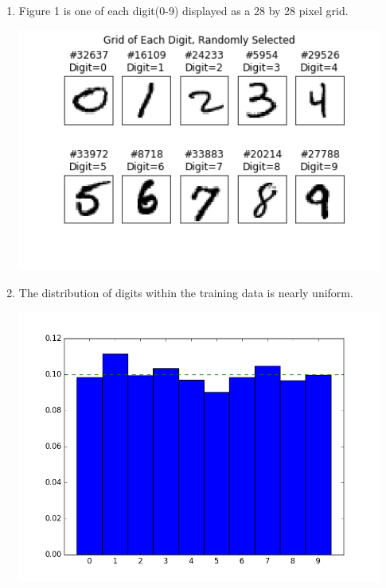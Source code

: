 \documentclass{report}
\begin{document}
\begin{enumerate}
\begin{enumerate}[label=(\alph*)]
		\item Figure 1 is one of each digit(0-9) displayed as a 28 by 28 pixel grid.  
		\begin{center}
		\includegraphics[width=12cm]{one_grid_x_each_digit.png}
		\end{center}
		\item The distribution of digits within the training data is nearly uniform.
		\begin{center}
		\includegraphics[width=12cm]{distrib.png}
		\end{center}
		

\end{enumerate}
\end{enumerate}
\end{document}
